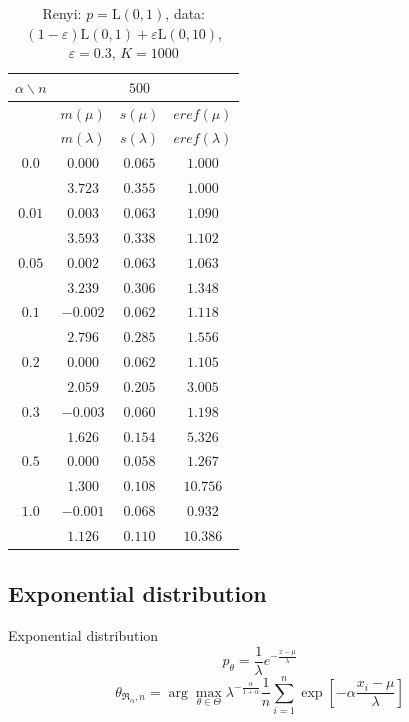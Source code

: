 \documentclass[11pt,a4paper]{beamer}
\newcommand{\amtiT}{\arg \max_{\theta \in \Theta}}
\begin{document}
\begin{frame}
\begin{table}[ht] \tiny 
\begin{center} 
\begin{tabular}{|c|ccc|} 
\hline 
$\alpha\backslash n$ &&  $500$ & \\ 
\hline 
& $m(\mu)$ & $s(\mu)$ & $eref(\mu)$ \\ 
& $m(\lambda)$ & $s(\lambda)$ & $eref(\lambda)$ \\ 
\hline 
$0.0$ & $ 0.000 $ & $ 0.065 $ & $ 1.000 $\\ 
 & $ 3.723 $ & $ 0.355 $ & $ 1.000 $\\ 
\hline 
$0.01$ & $ 0.003 $ & $ 0.063 $ & $ 1.090 $\\ 
 & $ 3.593 $ & $ 0.338 $ & $ 1.102 $\\ 
\hline 
$0.05$ &  $ 0.002 $ & $ 0.063 $ & $ 1.063 $\\ 
 &  $ 3.239 $ & $ 0.306 $ & $ 1.348 $\\ 
\hline 
$0.1$ &  $ -0.002 $ & $ 0.062 $ & $ 1.118 $\\ 
 &  $ 2.796 $ & $ 0.285 $ & $ 1.556 $\\ 
\hline 
$0.2$  & $ 0.000 $ & $ 0.062 $ & $ 1.105 $\\ 
 & $ 2.059 $ & $ 0.205 $ & $ 3.005 $\\ 
\hline 
$0.3$ & $ -0.003 $ & $ 0.060 $ & $ 1.198 $\\ 
 &  $ 1.626 $ & $ 0.154 $ & $ 5.326 $\\ 
\hline 
$0.5$ &  $ 0.000 $ & $ 0.058 $ & $ 1.267 $\\ 
 &  $ 1.300 $ & $ 0.108 $ & $ 10.756 $\\ 
\hline 
$1.0$ &  $ -0.001 $ & $ 0.068 $ & $ 0.932 $\\ 
 &  $ 1.126 $ & $ 0.110 $ & $ 10.386 $\\ 
\hline 
\end{tabular}
\caption{Renyi: $p = \mathrm{L}(0,1)$, data: $(1-\varepsilon)\mathrm{L}(0,1) + \varepsilon \mathrm{L}(0,10)$, $\varepsilon =  0.3$, $K = 1000$} 
\end{center}
\end{table}
\end{frame}



\subsection{Exponential distribution}
\begin{frame}{Exponential distribution} %
	\begin{equation*}
		p_\theta = \frac{1}{\lambda} e^{-\frac{x-\mu}{\lambda}  }
	\end{equation*}
	\begin{equation*}
		\theta_{\mathfrak{R}_\alpha,n} = \amtiT \lambda^{-\frac{\alpha}{1+\alpha}} \frac{1}{n}\sum_{i=1}^n \exp \left[-\alpha\frac{x_i-\mu}{\lambda} \right]
	\end{equation*}
	
	
\end{frame}
\end{document}
